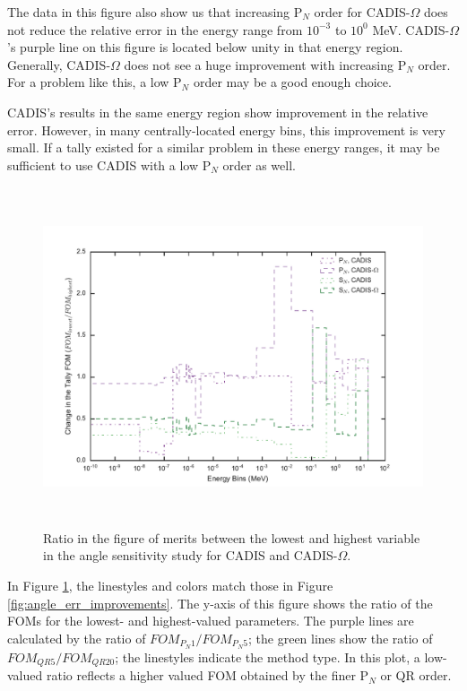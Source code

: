 The data in this figure also show us that increasing P$_N$ order for
CADIS-$\Omega$ does not reduce the relative error in the energy range from
$10^{-3}$ to $10^{0}$ MeV. CADIS-$\Omega$'s purple line on this figure is
located below unity in that energy region. Generally, 
CADIS-$\Omega$ does not see a huge improvement with increasing P$_N$ order.
For a problem like this, a low P$_N$ order may be a good enough choice.

CADIS's results in the same energy region show improvement in the
relative error. However, in many centrally-located energy bins, this improvement
is very small. If a tally existed for a similar problem in these energy ranges,
it may be sufficient to use CADIS with a low P$_N$ order as well.

\begin{figure}[h!]
  \centering
  \includegraphics[height=10cm]{./chapters/characterization_probs/figures/angle/prob_1/improvement_fom_allmethds.pdf}
  \caption[Ratio in the figure of merits between the lowest and highest variable in the angle
  sensitivity study for CADIS and CADIS-$\Omega$.]{Ratio in the figure of merits between
    the lowest and highest variable in the angle sensitivity study for CADIS and CADIS-$\Omega$.}
  \label{fig:angle_fom_improvements}
\end{figure}

In Figure \ref{fig:angle_fom_improvements}, the linestyles and colors match
those in Figure \ref{fig:angle_err_improvements}. The y-axis of this figure
shows the ratio of the FOMs for the lowest- and highest-valued parameters. The
purple lines are calculated by the ratio of $FOM_{P_N 1}/FOM_{P_N 5}$;
the green lines show the
ratio of $FOM_{QR 5}/FOM_{QR 20}$; the linestyles indicate the method
type. In this plot, a low-valued ratio reflects a higher valued FOM obtained by
the finer P$_N$ or QR order.

